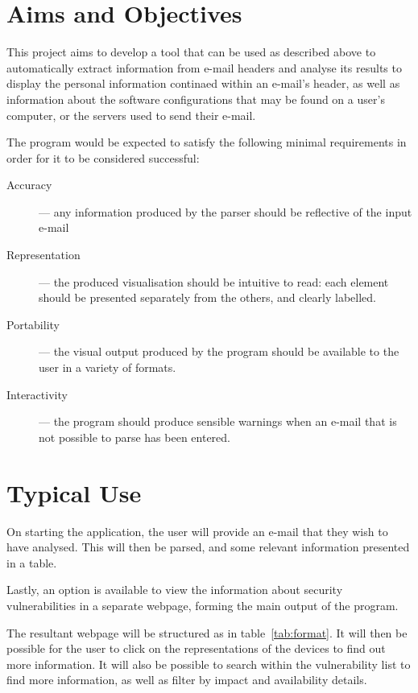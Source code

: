 \documentclass[twoside,10pt]{scrreprt}
\begin{document}
    \section{Aims and Objectives}

    This project aims to develop a tool that can be used as described above to
    automatically extract information from e-mail headers and analyse its results to
    display the personal information continaed within an e-mail's header, as well as
    information about the software configurations that may be found on a user's
    computer, or the servers used to send their e-mail.

    The program would be expected to satisfy the following minimal requirements
    in order for it to be considered successful: \begin{description} \item
    [{Accuracy}] --- any information produced by the parser should be reflective
    of the input e-mail

    \item [{Representation}] --- the produced visualisation should be intuitive
    to read: each element should be presented separately from the others, and
    clearly labelled.

    \item [{Portability}] --- the visual output produced by the program should
    be available to the user in a variety of formats.

    \item [{Interactivity}] --- the program should produce sensible warnings
    when an e-mail that is not possible to parse has been entered.
  \end{description}

  \section{Typical Use}

  On starting the application, the user will provide an e-mail that they wish
  to have analysed.  This will then be parsed, and some relevant information
  presented in a table.

  Lastly, an option is available to view the information about security
  vulnerabilities in a separate webpage, forming the main output of the
  program.

  The resultant webpage will be structured as in table~\ref{tab:format}.  It
  will then be possible for the user to click on the representations of the
  devices to find out more information.  It will also be possible to search
  within the vulnerability list to find more information, as well as filter by
  impact and availability details.
\end{document}
